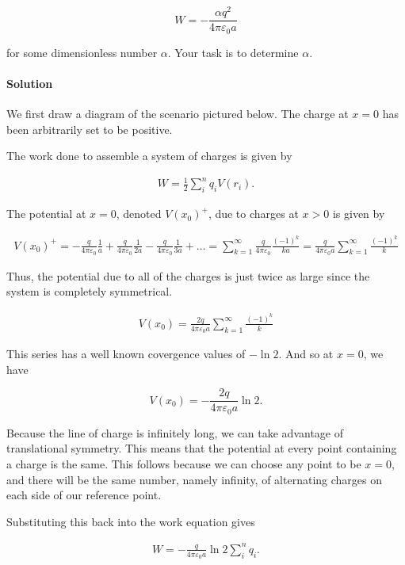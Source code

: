 \documentclass{article}
\begin{document}
\[
W = -\frac{\alpha q^2}{4\pi \varepsilon_0 a}
\]

for some dimensionless number \( \alpha \). Your task is to determine \( \alpha \).

\paragraph{Solution} We first draw a diagram of the scenario pictured below. The charge at $x = 0$ has been arbitrarily set to be positive. 



The work done to assemble a system of charges is given by 

\begin{align*}
    W = \frac{1}{2} \sum_i^n q_i V(r_i).
\end{align*}

The potential at $x = 0$, denoted $V(x_0)^+$, due to charges at $x > 0$ is given by 

\begin{align*}
    V(x_0)^+ = -\frac{q}{4\pi\varepsilon_0}\frac{1}{a} + \frac{q}{4\pi\varepsilon_0}\frac{1}{2a} - \frac{q}{4\pi\varepsilon_0}\frac{1}{3a} + \dots = \sum_{k = 1}^{\infty} \frac{q}{4\pi\varepsilon_0}\frac{(-1)^k}{ka} = \frac{q}{4\pi\varepsilon_0a}\sum_{k = 1}^{\infty}\frac{(-1)^k}{k}
\end{align*}

Thus, the potential due to all of the charges is just twice as large since the system is completely symmetrical.

\begin{align*}
    V(x_0) = \frac{2q}{4\pi\varepsilon_0a}\sum_{k = 1}^{\infty}\frac{(-1)^k}{k}
\end{align*}

This series has a well known covergence values of $-\ln{2}$. And so at $x = 0$, we have 

$$
V(x_0) = -\frac{2q}{4\pi\varepsilon_0a}\ln{2}.
$$

Because the line of charge is infinitely long, we can take advantage of translational symmetry. This means that the potential at every point containing a charge is the same. This follows because we can choose any point to be $x = 0$, and there will be the same number, namely infinity, of alternating charges on each side of our reference point. 

Substituting this back into the work equation gives

\begin{align*}
    W = -\frac{q}{4\pi\varepsilon_0a}\ln{2}\sum_i^n q_i.
\end{align*}
\end{document}
